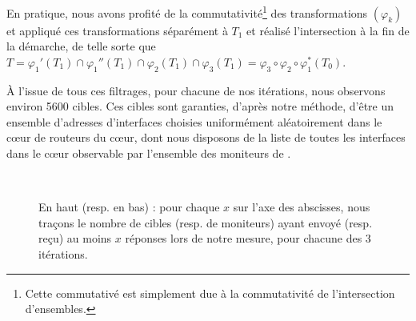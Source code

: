 En pratique, nous avons profité de la commutativité\footnote{Cette commutativé
est simplement due à la commutativité de l'intersection d'ensembles.} des
transformations $(\varphi_k)$ et appliqué ces transformations séparément à $T_1$
et réalisé l'intersection à la fin de la démarche, de telle sorte que $T =
\varphi_1'(T_1) \cap \varphi_1''(T_1) \cap \varphi_2(T_1) \cap \varphi_3(T_1) =
\varphi_3 \circ \varphi_2 \circ \varphi_1^*(T_0)$.

À l'issue de tous ces filtrages, pour chacune de nos itérations, nous observons
environ 5600 cibles. Ces cibles sont garanties, d'après notre méthode, d'être un
ensemble d'adresses d'interfaces choisies uniformément aléatoirement dans le
c\oe{}ur de routeurs du c\oe{}ur, dont nous disposons de la liste de toutes les
interfaces dans le c\oe{}ur observable par l'ensemble des moniteurs de
\planetlab.

\begin{figure}[!ht]\centering
{}
\\
\caption[Nombre d'observations par cible et par moniteur]{En haut (resp. en
bas) : pour chaque $x$ sur l'axe des abscisses, nous traçons le nombre de cibles
(resp. de moniteurs) ayant envoyé (resp. reçu) au moins $x$ réponses \icmp lors
de notre mesure, pour chacune des 3 itérations.}
\label{fig:udpping-measurement-purification}
\end{figure}


